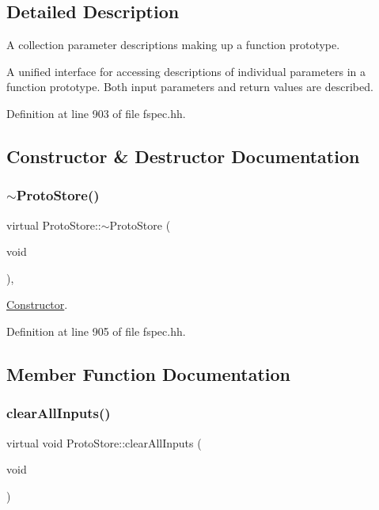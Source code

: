 \subsection{Detailed Description}
A collection parameter descriptions making up a function prototype. 

A unified interface for accessing descriptions of individual parameters in a function prototype. Both input parameters and return values are described. 

Definition at line 903 of file fspec.\+hh.



\subsection{Constructor \& Destructor Documentation}
\mbox{\label{class_proto_store_aefbc7f56e4d2f26b043bbdf74b6a8553}} 
\subsubsection{\texorpdfstring{$\sim$ProtoStore()}{~ProtoStore()}}
{\footnotesize\ttfamily virtual Proto\+Store\+::$\sim$\+Proto\+Store (\begin{DoxyParamCaption}\item[{void}]{ }\end{DoxyParamCaption})\hspace{0.3cm}{\ttfamily [inline]}, {\ttfamily [virtual]}}



\mbox{\hyperlink{class_constructor}{Constructor}}. 



Definition at line 905 of file fspec.\+hh.



\subsection{Member Function Documentation}
\mbox{\label{class_proto_store_a2b2eab8f123a06bb4f4619e039bb1106}} 
\subsubsection{\texorpdfstring{clearAllInputs()}{clearAllInputs()}}
{\footnotesize\ttfamily virtual void Proto\+Store\+::clear\+All\+Inputs (\begin{DoxyParamCaption}\item[{void}]{ }\end{DoxyParamCaption})\hspace{0.3cm}{\ttfamily [pure virtual]}}



